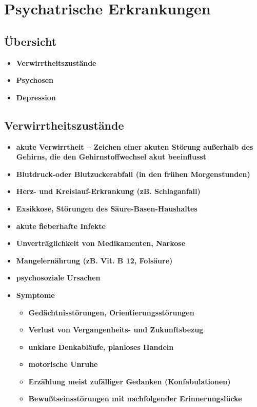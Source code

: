 \section{Psychatrische Erkrankungen}
	\subsection{Übersicht}
		\begin{itemize}
			\item \textbf{Verwirrtheitszustände}
			\item \textbf{Psychosen}
			\item \textbf{Depression}
		\end{itemize}
	\subsection{Verwirrtheitszustände}
		\begin{itemize}
			\item \textbf{akute Verwirrtheit – Zeichen einer akuten Störung außerhalb des Gehirns, die den Gehirnstoffwechsel akut beeinflusst}
			\item \textbf{Blutdruck-oder Blutzuckerabfall (in den frühen Morgenstunden)}
			\item \textbf{Herz- und Kreislauf-Erkrankung (zB. Schlaganfall)}
			\item \textbf{Exsikkose, Störungen des Säure-Basen-Haushaltes}
			\item \textbf{akute fieberhafte Infekte}
			\item \textbf{Unverträglichkeit von Medikamenten, Narkose}
			\item \textbf{Mangelernährung (zB. Vit. B 12, Folsäure)}
			\item \textbf{psychosoziale Ursachen}
			\item \textbf{Symptome}
				\begin{itemize}
					\item \textbf{Gedächtnisstörungen, Orientierungsstörungen}
					\item \textbf{Verlust von Vergangenheits- und Zukunftsbezug}
					\item \textbf{unklare Denkabläufe, planloses Handeln}
					\item \textbf{motorische Unruhe}
					\item \textbf{Erzählung meist zufälliger Gedanken (Konfabulationen)}
					\item \textbf{Bewußtseinsstörungen mit nachfolgender Erinnerungslücke}
				\end{itemize}
		\end{itemize}
